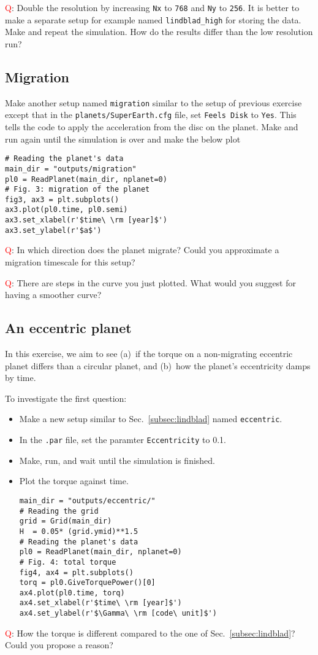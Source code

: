 \documentclass[14pt]{scrartcl}
\begin{document}
\textcolor{red}{Q}: Double the resolution by increasing \texttt{Nx} to \texttt{768} and \texttt{Ny} to \texttt{256}. It is better to make a separate setup for example named \texttt{lindblad\_high} for storing the data. Make and repeat the simulation. How do the results differ than the low resolution run?

\subsection{Migration} \label{subsec:migrating}	
Make another setup named \texttt{migration} similar to the setup of previous exercise except that in the \texttt{planets/SuperEarth.cfg} file, set \texttt{Feels Disk} to \texttt{Yes}. This tells the code to apply the acceleration from the disc on the planet. Make and run again until the simulation is over and make the below plot
\begin{verbatim}
# Reading the planet's data
main_dir = "outputs/migration"
pl0 = ReadPlanet(main_dir, nplanet=0)
# Fig. 3: migration of the planet
fig3, ax3 = plt.subplots()
ax3.plot(pl0.time, pl0.semi)
ax3.set_xlabel(r'$time\ \rm [year]$')
ax3.set_ylabel(r'$a$')
\end{verbatim}

\textcolor{red}{Q}: In which direction does the planet migrate? Could you approximate a migration timescale for this setup?

\textcolor{red}{Q}: There are steps in the curve you just plotted. What would you suggest for having a smoother curve?

\subsection{An eccentric planet} \label{subsec:ecc}	
In this exercise, we aim to see (a)~if the torque on a non-migrating eccentric planet differs than a circular planet, and (b)~how the planet's eccentricity damps by time.

To investigate the first question:
\begin{itemize}
	\item Make a new setup similar to Sec.~\ref{subsec:lindblad} named \texttt{eccentric}.
	\item In the \texttt{.par} file, set the paramter \texttt{Eccentricity} to 0.1.
	\item Make, run, and wait until the simulation is finished.
	\item Plot the torque against time.
	\begin{verbatim}
main_dir = "outputs/eccentric/"
# Reading the grid
grid = Grid(main_dir)
H  = 0.05* (grid.ymid)**1.5
# Reading the planet's data
pl0 = ReadPlanet(main_dir, nplanet=0)
# Fig. 4: total torque
fig4, ax4 = plt.subplots()
torq = pl0.GiveTorquePower()[0]
ax4.plot(pl0.time, torq)
ax4.set_xlabel(r'$time\ \rm [year]$')
ax4.set_ylabel(r'$\Gamma\ \rm [code\ unit]$')
\end{verbatim}
\end{itemize} 
\textcolor{red}{Q}: How the torque is different compared to the one of Sec.~\ref{subsec:lindblad}? Could you propose a reason?
\end{document}
